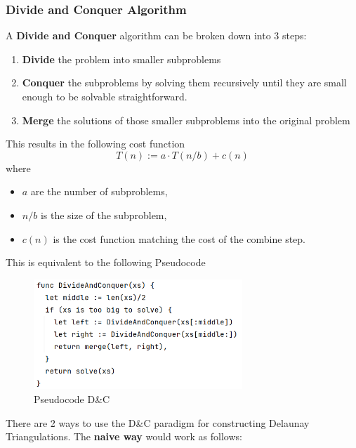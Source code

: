 \subsubsection{Divide and Conquer Algorithm}
A \textbf{Divide and Conquer} algorithm can be broken down into 3 steps:
\begin{enumerate}
    \item \textbf{Divide} the problem into smaller subproblems
    \item \textbf{Conquer} the subproblems by solving them recursively until they are small enough to be solvable straightforward.
    \item \textbf{Merge} the solutions of those smaller subproblems into the original problem
\end{enumerate}
This results in the following cost function
\[
T(n) := a\cdot T(n/b) + c(n)
\]
where
\begin{itemize}
    \item $a$ are the number of subproblems,
    \item $n/b$ is the size of the subproblem,
    \item $c(n)$ is the cost function matching the cost of the combine step.
\end{itemize}
This is equivalent to the following Pseudocode
\begin{figure}[H]
    \centering
    \includegraphics[width=0.7\textwidth]{pseudocode_dnc.PNG}
    \caption{Pseudocode D\&C}
    \label{fig:my_label}
\end{figure}
There are 2 ways to use the D\&C paradigm for constructing Delaunay Triangulations.
\newpage
The \textbf{naive way} would work as follows:
